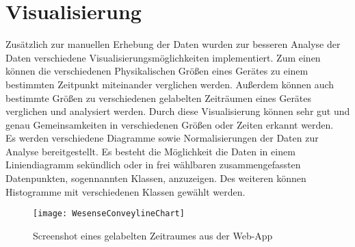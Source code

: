 \section{Visualisierung}\label{VisualisierungWebApp}

        Zusätzlich zur manuellen Erhebung der Daten wurden zur besseren Analyse der Daten verschiedene Visualisierungsmöglichkeiten implementiert.
        Zum einen können die verschiedenen Physikalischen Größen eines Gerätes zu einem bestimmten Zeitpunkt miteinander verglichen werden.
        Außerdem können auch bestimmte Größen zu verschiedenen gelabelten Zeiträumen eines Gerätes verglichen und analysiert werden. 
        Durch diese Visualisierung können sehr gut und genau Gemeinsamkeiten in verschiedenen Größen oder Zeiten erkannt werden.\\
        \newline
        Es werden verschiedene Diagramme sowie Normalisierungen der Daten zur Analyse bereitgestellt.
        Es besteht die Möglichkeit die Daten in einem Liniendiagramm sekündlich oder in frei wählbaren zusammengefassten Datenpunkten, sogennannten Klassen, anzuzeigen.
        Des weiteren können Histogramme mit verschiedenen Klassen gewählt werden.

        \begin{figure}[h]
            \centering
            \texttt{[image: WesenseConveylineChart]}
            \caption{Screenshot eines gelabelten Zeitraumes aus der Web-App}
            \label{fig:WebApp2}
        \end{figure}
